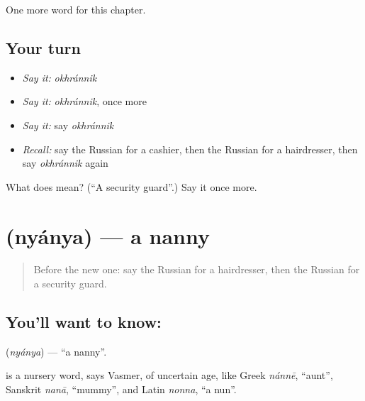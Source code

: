 \begin{grammarlens}[title={What you've built}]
One more word for this chapter.
\end{grammarlens}

\subsection*{Your turn}
\begin{itemize}
\raggedright
  \item \emph{Say it:} \emph{okhránnik}
  \item \emph{Say it:} \emph{okhránnik}, once more
  \item \emph{Say it:} say \emph{okhránnik}
  \item \emph{Recall:} say the Russian for a cashier, then the Russian for a hairdresser, then say \emph{okhránnik} again
\end{itemize}

\begin{tcolorbox}[breakable,colback=teal!4,colframe=teal!35!black,title={Before you move on}]
What does  mean? (\textquotedblleft{}A security guard\textquotedblright{}.) Say it once more.
\end{tcolorbox}
\section[\texorpdfstring{\ru{няня} (nyánya)}{няня (nyánya)}]{ (nyánya) — a nanny}

\label{lesson:RU-C230-nyanya}



\begin{quote}
Before the new one: say the Russian for a hairdresser, then the Russian for a security guard.
\end{quote}

\subsection*{You'll want to know: }
\textbf{} (\emph{nyánya}) — \textquotedblleft{}a nanny\textquotedblright{}.

\begin{cousinweb}
\textbf{} is a nursery word, says Vasmer, of uncertain age, like Greek \emph{nánnē}, \textquotedblleft{}aunt\textquotedblright{}, Sanskrit \emph{nanā}, \textquotedblleft{}mummy\textquotedblright{}, and Latin \emph{nonna}, \textquotedblleft{}a nun\textquotedblright{}.
\end{cousinweb}

